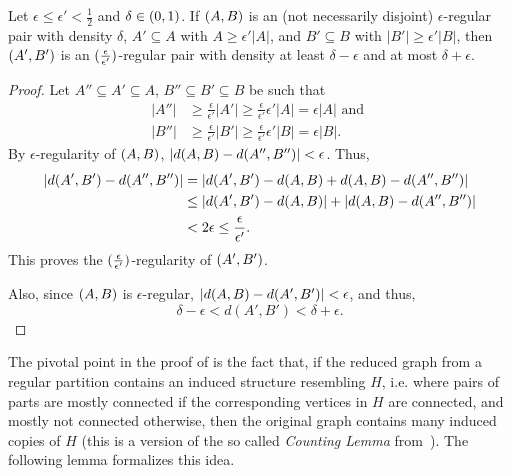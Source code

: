         \begin{lemma} \label{lem:regularity_is_transitive}
            Let $\epsilon \leq \epsilon' < \frac{1}{2}$ and $\delta \in ( 0, 1 )$.
            If $( A,B )$ is an (not necessarily disjoint) $\epsilon$-regular pair with density $\delta$, $A' \subseteq A$ with
            $A \geq \epsilon' |A|$, and $B' \subseteq B$ with $|B'| \geq \epsilon' |B|$, then $( A', B' )$ is an
            $( \frac{\epsilon}{\epsilon'} )$-regular pair with density at least $\delta - \epsilon$ and at most $\delta + \epsilon$.
            \begin{proof}
                Let $A'' \subseteq A' \subseteq A$, $B'' \subseteq B' \subseteq B$ be such that
                \begin{align*}
                    |A''| & \geq \frac{\epsilon}{\epsilon'} |A'| \geq \frac{\epsilon}{\epsilon'} \epsilon' |A| = \epsilon |A|
                    \text{ and } \\
                    |B''| & \geq \frac{\epsilon}{\epsilon'} |B'| \geq \frac{\epsilon}{\epsilon'} \epsilon' |B| = \epsilon |B|.
                \end{align*}
                By $\epsilon$-regularity of $( A,B )$, $| d(A,B) - d(A'',B'') | < \epsilon$.
                Thus,
                \begin{align*}
                    | d(A',B') - d(A'',B'') |
                        & = | d(A',B') - d(A,B) + d(A,B) - d(A'',B'') | \\
                        & \leq | d(A',B') - d(A,B) | + | d(A,B) - d(A'',B'') | \\
                        & < 2 \epsilon \leq \frac{\epsilon}{\epsilon'}.
                \end{align*}
                This proves the $( \frac{\epsilon}{\epsilon'} )$-regularity of $( A',B' )$.

                Also, since $( A,B )$ is $\epsilon$-regular, $| d(A,B) - d(A',B') | < \epsilon$,
                and thus,
                \[
                    \delta - \epsilon < d(A',B') < \delta + \epsilon.
                \]
            \end{proof}
        \end{lemma}

        The pivotal point in the proof of  is the fact that, if the
        reduced graph  from a regular partition contains an induced structure resembling $H$, i.e. where pairs of parts are
        mostly connected if the corresponding vertices in $H$ are connected, and mostly not connected otherwise,
        then the original graph contains many induced copies of $H$ (this is a version of the so called \emph{Counting Lemma}
        from~\cite{the_regulariy_lemma_and_its_applications_in_graph_theory}).
        The following lemma formalizes this idea.

